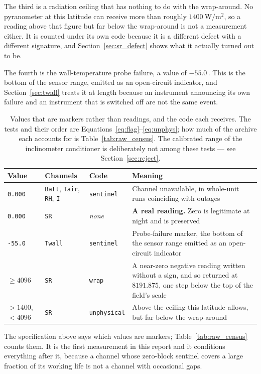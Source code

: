 \documentclass[11pt,a4paper]{article}
\begin{document}
The third is a radiation ceiling that has nothing to do with the wrap-around. No pyranometer at this latitude can receive more than roughly $1400\ \mathrm{W/m^2}$, so a reading above that figure but far below the wrap-around is not a measurement either. It is counted under its own code because it is a different defect with a different signature, and Section~\ref{sec:sr_defect} shows what it actually turned out to be.

The fourth is the wall-temperature probe failure, a value of $-55.0$\,\degC. This is the bottom of the sensor range, emitted as an open-circuit indicator, and Section~\ref{sec:twall} treats it at length because an instrument announcing its own failure and an instrument that is switched off are not the same event.

\begin{table}[H]
\centering
\small
\begin{tabularx}{\textwidth}{L{2.2cm}L{2.6cm}L{2.3cm}Y}
\toprule
\textbf{Value} & \textbf{Channels} & \textbf{Code} &
\textbf{Meaning} \\
\midrule
\texttt{0.000} & \texttt{Batt}, \texttt{Tair}, \texttt{RH}, \texttt{I} &
\texttt{sentinel} &
Channel unavailable, in whole-unit runs coinciding with outages \\
\texttt{0.000} & \texttt{SR} & \emph{none} &
\textbf{A real reading.} Zero is legitimate at night and is preserved \\
\texttt{-55.0} & \texttt{Twall} & \texttt{sentinel} &
Probe-failure marker, the bottom of the sensor range emitted as an
open-circuit indicator \\
$\geq 4096$ & \texttt{SR} & \texttt{wrap} &
A near-zero negative reading written without a sign, and so returned at
$8191.875$, one step below the top of the field's scale \\
$> 1400$, $< 4096$ & \texttt{SR} & \texttt{unphysical} &
Above the ceiling this latitude allows, but far below the wrap-around \\
\bottomrule
\end{tabularx}
\caption{Values that are markers rather than readings, and the code each receives. The tests and their order are Equations~\eqref{eq:flag}--\eqref{eq:unphys}; how much of the archive each accounts for is Table~\ref{tab:raw_census}. The calibrated range of the inclinometer conditioner is deliberately not among these tests --- see Section~\ref{sec:reject}.}
\label{tab:sentinels}
\end{table}

The specification above says which values are markers; Table~\ref{tab:raw_census} counts them. It is the first measurement in this report and it conditions everything after it, because a channel whose zero-block sentinel covers a large fraction of its working life is not a channel with occasional gaps.
\end{document}
